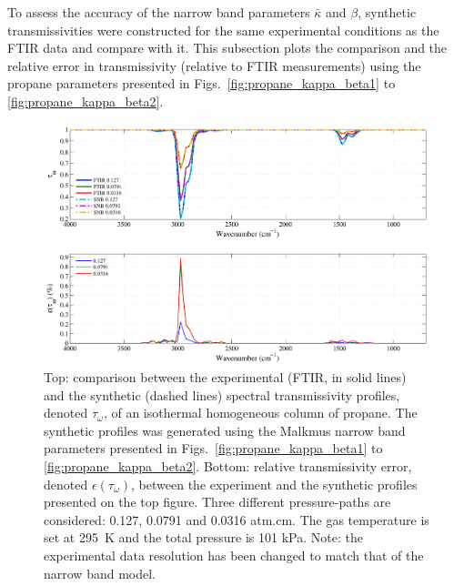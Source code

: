 To assess the accuracy of the narrow band parameters $\bar{\kappa}$ and $\beta$, synthetic transmissivities were constructed for the same experimental conditions as the FTIR data and compare with it. This subsection plots the comparison and the relative error in transmissivity (relative to FTIR measurements) using the propane parameters presented in Figs.~\ref{fig:propane_kappa_beta1} to \ref{fig:propane_kappa_beta2}.

\begin{figure}[!h]
\includegraphics[width=\textwidth]{Figures/Comparison_Fit_Propane_MALKMUS_Temp295K.pdf}
\caption{Top: comparison between the experimental (FTIR, in solid lines) and the synthetic (dashed lines) spectral transmissivity profiles, denoted $\tau_{\omega}$, of an isothermal homogeneous column of propane. The synthetic profiles was generated using the Malkmus narrow band parameters presented in Figs.~\ref{fig:propane_kappa_beta1} to \ref{fig:propane_kappa_beta2}. Bottom: relative transmissivity error, denoted $\epsilon{(\tau_{\omega})}$, between the experiment and the synthetic profiles presented on the top figure. Three different pressure-paths are considered: 0.127, 0.0791 and 0.0316 atm.cm. The gas temperature is set at 295~K and the total pressure is 101 kPa. Note: the experimental data resolution has been changed to match that of the narrow band model. \label{fig:propane_SNBVerify_295K}}
\end{figure}


